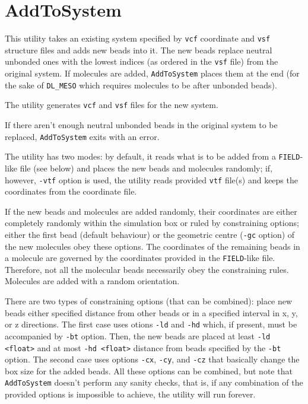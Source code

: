 \section{AddToSystem} \label{sec:AddToSystem}

This utility takes an existing system specified by \texttt{vcf} coordinate
and \texttt{vsf} structure files and adds new beads into it. The new beads
replace neutral unbonded ones with the lowest indices (as ordered in the
\texttt{vsf} file) from the original system. If molecules are added,
\texttt{AddToSystem} places them at the end (for the sake of
\texttt{DL\_MESO} which requires molecules to be after unbonded beads).

The utility generates \texttt{vcf} and \texttt{vsf} files for the new
system.

If there aren't enough neutral unbonded beads in the original system to be
replaced, \texttt{AddToSystem} exits with an error.

The utility has two modes: by default, it reads what is to be added from a
\texttt{FIELD}-like file (see below) and places the new beads and molecules
randomly; if, however, \texttt{-vtf} option is used, the utility reads
provided \texttt{vtf} file(s) and keeps the coordinates from the coordinate
file.

If the new beads and molecules are added randomly, their coordinates are
either completely randomly within the simulation box or ruled by
constraining options; either the first bead (default behaviour) or the
geometric centre (\texttt{-gc} option) of the new molecules obey these
options. The coordinates of the remaining beads in a molecule are governed
by the coordinates provided in the \texttt{FIELD}-like file. Therefore, not
all the molecular beads necessarily obey the constraining rules. Molecules
are added with a random orientation.

There are two types of constraining options (that can be combined): place
new beads either specified distance from other beads or in a specified
interval in x, y, or z directions. The first case uses otions \texttt{-ld}
and \texttt{-hd} which, if present, must be accompanied by \texttt{-bt}
option.  Then, the new beads are placed at least \texttt{-ld <float>} and
at most \texttt{-hd <float>} distance from beads specified by the
\texttt{-bt} option. The second case uses options \texttt{-cx},
\texttt{-cy}, and \texttt{-cz} that basically change the box size for the
added beads. All these options can be combined, but note that
\texttt{AddToSystem} doesn't perform any sanity checks, that is, if any
combination of the provided options is impossible to achieve, the utility
will run forever.

